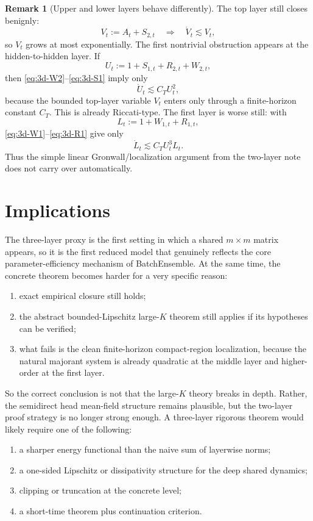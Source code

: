 \documentclass{article}
\theoremstyle{definition}
\newtheorem{remark}[theorem]{Remark}
\begin{document}
\begin{remark}[Upper and lower layers behave differently]
\label{rem:3layer-hierarchy}
The top layer still closes benignly:
\[
  V_t:=A_t+S_{2,t}
  \quad\Longrightarrow\quad
  \dot V_t \lesssim V_t,
\]
so $V_t$ grows at most exponentially. The first nontrivial obstruction appears at the hidden-to-hidden layer. If
\[
  U_t:=1+S_{1,t}+R_{2,t}+W_{2,t},
\]
then \eqref{eq:3d-W2}--\eqref{eq:3d-S1} imply only
\[
  \dot U_t \lesssim C_T U_t^2,
\]
because the bounded top-layer variable $V_t$ enters only through a finite-horizon constant $C_T$. This is already Riccati-type. The first layer is worse still: with
\[
  L_t:=1+W_{1,t}+R_{1,t},
\]
\eqref{eq:3d-W1}--\eqref{eq:3d-R1} give only
\[
  \dot L_t \lesssim C_T U_t^3 L_t.
\]
Thus the simple linear Gronwall/localization argument from the two-layer note does not carry over automatically.
\end{remark}

\section{Implications}

The three-layer proxy is the first setting in which a shared $m\times m$ matrix appears, so it is the first reduced model that genuinely reflects the core parameter-efficiency mechanism of BatchEnsemble. At the same time, the concrete theorem becomes harder for a very specific reason:
\begin{enumerate}[leftmargin=2em]
  \item exact empirical closure still holds;
  \item the abstract bounded-Lipschitz large-$K$ theorem still applies if its hypotheses can be verified;
  \item what fails is the clean finite-horizon compact-region localization, because the natural majorant system is already quadratic at the middle layer and higher-order at the first layer.
\end{enumerate}
So the correct conclusion is not that the large-$K$ theory breaks in depth. Rather, the semidirect head mean-field structure remains plausible, but the two-layer proof strategy is no longer strong enough. A three-layer rigorous theorem would likely require one of the following:
\begin{enumerate}[leftmargin=2em]
  \item a sharper energy functional than the naive sum of layerwise norms;
  \item a one-sided Lipschitz or dissipativity structure for the deep shared dynamics;
  \item clipping or truncation at the concrete level;
  \item a short-time theorem plus continuation criterion.
\end{enumerate}
\end{document}
